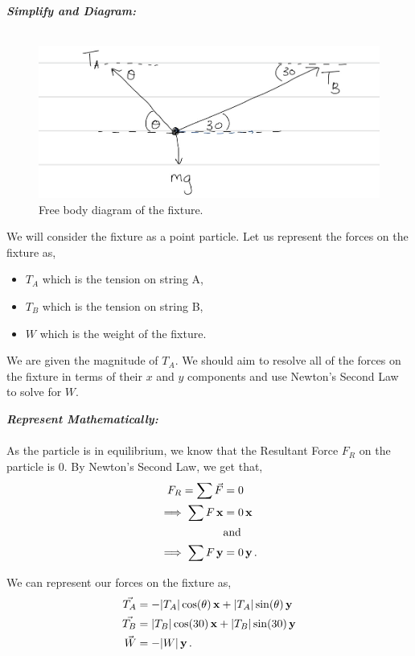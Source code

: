 \begin{subquestions}
\begin{subsubquestions}
\textbf{\textit{Simplify and Diagram:}} \\ \\
\begin{figure}[H]
	\begin{center}
		\includegraphics[scale=0.25]{../2016/figures/2016q5-2}
		\caption{\label{2016:q5:Diagram1} Free body diagram of the fixture.}
	\end{center}
\end{figure}
We will consider the fixture as a point particle. Let us represent the forces on the fixture as,
\begin{itemize}
	\item $T_A$ which is the tension on string A,
	\item $T_B$ which is the tension on string B, 
	\item $W$ which is the weight of the fixture.
\end{itemize}
We are given the magnitude of $T_A$. We should aim to resolve all of the forces on the fixture in terms of their $x$ and $y$ components and use Newton's Second Law to solve for $W$.




\textbf{\textit{Represent Mathematically:}} \\ \\
As the particle is in equilibrium, we know that the Resultant Force $F_R$ on the particle is 0. By Newton's Second Law, we get that,
\begin{align}
	F_R = \sum \vec{F} & = 0 \nonumber \\
	\implies \sum F \,\mathbf{x} & = 0 \,\mathbf{x} \label{2016:q5:XEqn1} \\
	& \text{and} \nonumber \\
	\implies \sum F \,\mathbf{y} & = 0 \,\mathbf{y} \label{2016:q5:YEqn1} \,.
\end{align}

We can represent our forces on the fixture as,
\begin{align}
	\vec{T_A} & = -|T_A|\cos(\theta)\,\mathbf{x} +|T_A|\sin(\theta)\,\mathbf{y}  \\
	\vec{T_B} & = |T_B|\cos(30)\,\mathbf{x}+|T_B|\sin(30)\,\mathbf{y}  \\ 
	\vec{W} & = -|W|\,\mathbf{y} \,.
\end{align}





\end{subsubquestions}
\end{subquestions}
